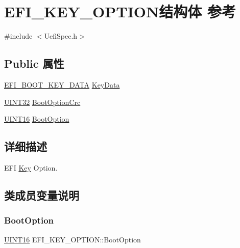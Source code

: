 \hypertarget{struct_e_f_i___k_e_y___o_p_t_i_o_n}{}\section{E\+F\+I\+\_\+\+K\+E\+Y\+\_\+\+O\+P\+T\+I\+O\+N结构体 参考}
\label{struct_e_f_i___k_e_y___o_p_t_i_o_n}


{\ttfamily \#include $<$Uefi\+Spec.\+h$>$}

\subsection*{Public 属性}
\begin{DoxyCompactItemize}
\item 
\hyperlink{union_e_f_i___b_o_o_t___k_e_y___d_a_t_a}{E\+F\+I\+\_\+\+B\+O\+O\+T\+\_\+\+K\+E\+Y\+\_\+\+D\+A\+TA} \hyperlink{struct_e_f_i___k_e_y___o_p_t_i_o_n_af1d71adda55302fa05dd49abaa79d2c8}{Key\+Data}
\item 
\hyperlink{_processor_bind_8h_ae1e6edbbc26d6fbc71a90190d0266018}{U\+I\+N\+T32} \hyperlink{struct_e_f_i___k_e_y___o_p_t_i_o_n_aa6cdcd2eae63b279bba8979a6d89995d}{Boot\+Option\+Crc}
\item 
\hyperlink{_processor_bind_8h_a09f1a1fb2293e33483cc8d44aefb1eb1}{U\+I\+N\+T16} \hyperlink{struct_e_f_i___k_e_y___o_p_t_i_o_n_ae5ea30f70fc3316f378e911633e39a66}{Boot\+Option}
\end{DoxyCompactItemize}


\subsection{详细描述}
E\+FI \hyperlink{struct_key}{Key} Option. 

\subsection{类成员变量说明}
\mbox{\label{struct_e_f_i___k_e_y___o_p_t_i_o_n_ae5ea30f70fc3316f378e911633e39a66}} 
\subsubsection{\texorpdfstring{Boot\+Option}{BootOption}}
{\footnotesize\ttfamily \hyperlink{_processor_bind_8h_a09f1a1fb2293e33483cc8d44aefb1eb1}{U\+I\+N\+T16} E\+F\+I\+\_\+\+K\+E\+Y\+\_\+\+O\+P\+T\+I\+O\+N\+::\+Boot\+Option}

